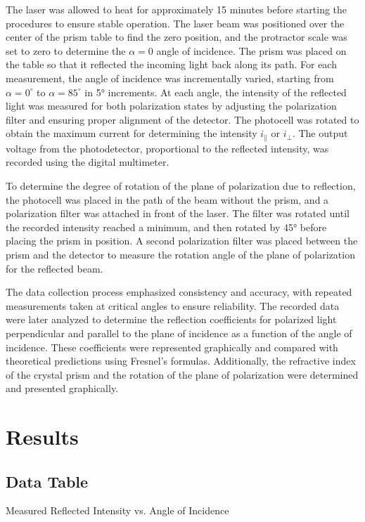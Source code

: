 \documentclass[journal]{IEEEtran}
\begin{document}
The laser was allowed to heat for approximately 15 minutes before starting the procedures to ensure stable operation. The laser beam was positioned over the center of the prism table to find the zero position, and the protractor scale was set to zero to determine the $\alpha = 0$ angle of incidence. The prism was placed on the table so that it reflected the incoming light back along its path.
For each measurement, the angle of incidence was incrementally varied, starting from $\alpha = 0^\circ$ to $\alpha = 85^\circ$ in 5° increments. At each angle, the intensity of the reflected light was measured for both polarization states by adjusting the polarization filter and ensuring proper alignment of the detector. The photocell was rotated to obtain the maximum current for determining the intensity $i_{\parallel}$ or $i_{\perp}$. The output voltage from the photodetector, proportional to the reflected intensity, was recorded using the digital multimeter.

To determine the degree of rotation of the plane of polarization due to reflection, the photocell was placed in the path of the beam without the prism, and a polarization filter was attached in front of the laser. The filter was rotated until the recorded intensity reached a minimum, and then rotated by 45° before placing the prism in position. A second polarization filter was placed between the prism and the detector to measure the rotation angle of the plane of polarization for the reflected beam.

The data collection process emphasized consistency and accuracy, with repeated measurements taken at critical angles to ensure reliability. The recorded data were later analyzed to determine the reflection coefficients for polarized light perpendicular and parallel to the plane of incidence as a function of the angle of incidence. These coefficients were represented graphically and compared with theoretical predictions using Fresnel's formulas. Additionally, the refractive index of the crystal prism and the rotation of the plane of polarization were determined and presented graphically.

\section{Results}
\subsection{Data Table}
\begin{table}[H]
    \centering
    \caption{Measured Reflected Intensity vs. Angle of Incidence}
    \label{tab:reflection_data}
\end{table}
\end{document}

